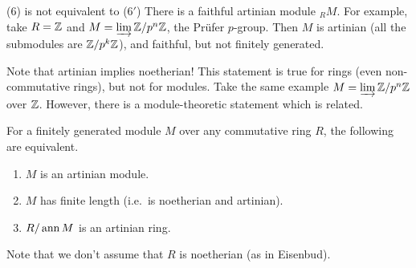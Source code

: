  \begin{remark}
   ($6$) is not equivalent to ($6'$) There is a faithful artinian module ${}_R M$. For
   example, take $R=\mathbb{Z}$ and $M = \varinjlim \mathbb{Z}/p^n\mathbb{Z}$, the Pr\"ufer $p$-group. Then
   $M$ is artinian (all the submodules are $\mathbb{Z}/p^k\mathbb{Z}$), and faithful, but not finitely
   generated.
 \end{remark}
 \begin{remark}
   Note that artinian implies noetherian! This statement is true for rings (even
   non-commutative rings), but not for modules. Take the same example $M = \varinjlim
   \mathbb{Z}/p^n\mathbb{Z}$ over $\mathbb{Z}$. However, there is a module-theoretic statement which is
   related.
 \end{remark}
 \begin{corollary}
   For a finitely generated module $M$ over any commutative ring $R$, the following are
   equivalent.
   \begin{enumerate}
     \item $M$ is an artinian module.
     \item $M$ has finite length (i.e.\ is noetherian and artinian).
     \item $R/\operatorname{ann} M$ is an artinian ring.
   \end{enumerate}
 \end{corollary}
 Note that we don't assume that $R$ is noetherian (as in Eisenbud).
